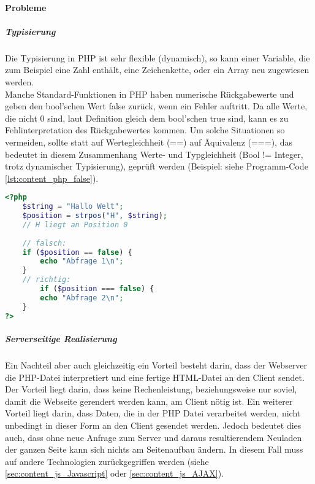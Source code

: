 \paragraph{Probleme}
\subparagraph{Typisierung} 
Die Typisierung in PHP ist sehr flexible (dynamisch), so kann einer Variable, die zum Beispiel eine Zahl enthält, 
eine Zeichenkette, oder ein Array neu zugewiesen werden. \\
Manche Standard-Funktionen in PHP haben numerische Rückgabewerte und geben den bool'schen Wert false zurück, 
wenn ein Fehler auftritt. Da alle Werte, die nicht 0 sind, laut Definition gleich dem bool'schen true sind, 
kann es zu Fehlinterpretation des Rückgabewertes kommen. Um solche Situationen so vermeiden, sollte statt auf Wertegleichheit (==) auf Äquivalenz (===), das bedeutet in diesem Zusammenhang Werte- und Typgleichheit (Bool != Integer, trotz dynamischer Typisierung), geprüft werden (Beispiel: siehe Programm-Code \ref{lst:content_php_false}).
\begin{lstlisting}[style=custom, language=PHP,  caption={false},label={lst:content_php_false}]
<?php 
	$string = "Hallo Welt";
	$position = strpos("H", $string); 
	// H liegt an Position 0
	
	// falsch:
	if ($position == false) {
		echo "Abfrage 1\n";
	}
	// richtig:
		if ($position === false) {
		echo "Abfrage 2\n";
	}
?>
\end{lstlisting}
\subparagraph{Serverseitige Realisierung}
Ein Nachteil aber auch gleichzeitig ein Vorteil besteht darin, dass der Webserver die PHP-Datei interpretiert und eine fertige HTML-Datei an den Client sendet. Der Vorteil liegt darin, dass keine Rechenleistung, beziehungsweise nur soviel, damit die Webseite gerendert werden kann, am Client nötig ist. Ein weiterer Vorteil liegt darin, dass Daten, die in der PHP Datei verarbeitet werden, nicht unbedingt in dieser Form an den Client gesendet werden. 
Jedoch bedeutet dies auch, dass ohne neue Anfrage zum Server und 
daraus resultierendem Neuladen der ganzen Seite kann sich nichts am Seitenaufbau ändern. 
In diesem Fall muss auf andere Technologien zurückgegriffen werden (siehe \ref{sec:content_js_Javascript} oder \ref{sec:content_js_AJAX}).

